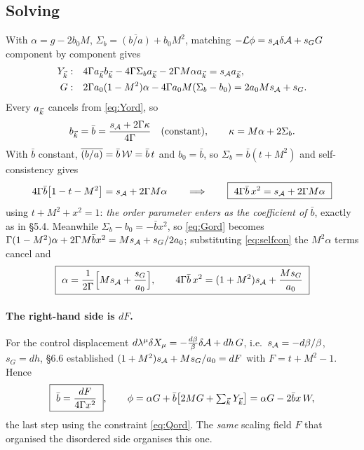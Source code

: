 \subsection{Solving}
With $\alpha=g-2b_0M$, $\Sigma_b=\overline{(b/a)}+b_0M^{2}$, matching
$-\mathcal{L}\phi=s_{\mathcal{A}}\delta\mathcal{A}+s_G G$ component by component gives
\begin{align}
  Y_{\vec k}:&\quad 4\Gamma a_{\vec k}b_{\vec k}-4\Gamma\Sigma_b a_{\vec k}-2\Gamma M\alpha a_{\vec k}=s_{\mathcal{A}}a_{\vec k},
  \label{eq:Yord}\\
  G:&\quad 2\Gamma a_0(1-M^{2})\alpha-4\Gamma a_0M(\Sigma_b-b_0)=2a_0Ms_{\mathcal{A}}+s_G .
  \label{eq:Gord}
\end{align}
Every $a_{\vec k}$ cancels from \eqref{eq:Yord}, so
\begin{equation}
  b_{\vec k}=\bar b=\frac{s_{\mathcal{A}}+2\Gamma\kappa}{4\Gamma}\quad\text{(constant)},
  \qquad \kappa=M\alpha+2\Sigma_b .
\end{equation}
With $\bar b$ constant, $\overline{(b/a)}=\bar b\,\mathcal{W}=\bar b\,t$ and $b_0=\bar b$, so
$\Sigma_b=\bar b(t+M^{2})$ and self-consistency gives
\begin{equation}
  4\Gamma\bar b\big[1-t-M^{2}\big]=s_{\mathcal{A}}+2\Gamma M\alpha
  \qquad\Longrightarrow\qquad
  \boxed{\ 4\Gamma\bar b\,x^{2}=s_{\mathcal{A}}+2\Gamma M\alpha\ }
  \label{eq:selfcon}
\end{equation}
using $t+M^{2}+x^{2}=1$: \emph{the order parameter enters as the coefficient of $\bar b$},
exactly as in \S5.4. Meanwhile $\Sigma_b-b_0=-\bar b x^{2}$, so \eqref{eq:Gord} becomes
$\Gamma(1-M^{2})\alpha+2\Gamma M\bar bx^{2}=Ms_{\mathcal{A}}+s_G/2a_0$; substituting
\eqref{eq:selfcon} the $M^{2}\alpha$ terms cancel and
\begin{equation}
  \boxed{\ \alpha=\frac{1}{2\Gamma}\Big[Ms_{\Ac}+\frac{s_G}{a_0}\Big],
  \qquad
  4\Gamma\bar b\,x^{2}=(1+M^{2})s_{\Ac}+\frac{M s_G}{a_0}\ }
  \label{eq:sol8}
\end{equation}

\paragraph{The right-hand side is $dF$.} For the control displacement
$d\lambda^\mu\delta X_\mu=-\tfrac{d\beta}{\beta}\delta\mathcal{A}+dh\,G$, i.e.\
$s_{\mathcal{A}}=-d\beta/\beta$, $s_G=dh$, \S6.6 established
$(1+M^{2})s_{\mathcal{A}}+Ms_G/a_0=dF$ with $F=t+M^{2}-1$. Hence
\begin{equation}
  \boxed{\ \bar b=\frac{dF}{4\Gamma x^{2}}\ },
  \qquad
  \phi=\alpha G+\bar b\big[2MG+\textstyle\sum_{\vec k}Y_{\vec k}\big]=\alpha G-2\bar b x\,W ,
\end{equation}
the last step using the constraint \eqref{eq:Qord}. The \emph{same} scaling field $F$ that
organised the disordered side organises this one.

